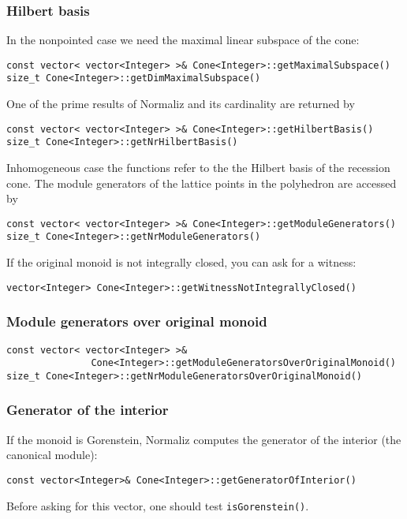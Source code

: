\documentclass[12pt,a4paper]{scrartcl}
\theoremstyle{definition}
\begin{document}
\begin{small}
\subsubsection{Hilbert basis}\label{HB_lib}

In the nonpointed case we need the maximal linear subspace of the cone:
\begin{Verbatim}
const vector< vector<Integer> >& Cone<Integer>::getMaximalSubspace()
size_t Cone<Integer>::getDimMaximalSubspace()
\end{Verbatim}

One of the prime results of Normaliz and its cardinality are returned by
\begin{Verbatim}
const vector< vector<Integer> >& Cone<Integer>::getHilbertBasis()
size_t Cone<Integer>::getNrHilbertBasis()
\end{Verbatim}
Inhomogeneous case the functions refer to the the Hilbert basis of the recession cone. The module generators of the lattice points in the polyhedron are accessed by
\begin{Verbatim}
const vector< vector<Integer> >& Cone<Integer>::getModuleGenerators()
size_t Cone<Integer>::getNrModuleGenerators()
\end{Verbatim}

If the original monoid is not integrally closed, you can ask for a witness:
\begin{Verbatim}
vector<Integer> Cone<Integer>::getWitnessNotIntegrallyClosed()
\end{Verbatim}

\subsubsection{Module generators over original monoid}

\begin{Verbatim}
const vector< vector<Integer> >& 
               Cone<Integer>::getModuleGeneratorsOverOriginalMonoid()
size_t Cone<Integer>::getNrModuleGeneratorsOverOriginalMonoid()
\end{Verbatim}

\subsubsection{Generator of the interior}\label{GenInt}

If the monoid is Gorenstein, Normaliz computes the generator of the interior (the canonical module):
\begin{Verbatim}
const vector<Integer>& Cone<Integer>::getGeneratorOfInterior()
\end{Verbatim}
Before asking for this vector, one should test \verb|isGorenstein()|.


\end{small}
\end{document}
